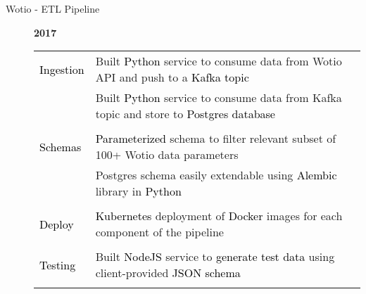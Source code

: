 \documentclass[12pt]{article}
\begin{document}
\begin{description}
\begin{description}
                \item[Wotio - ETL Pipeline] \hfill \textbf{2017}\\
		\textcolor{gray}{
			    \begin{tabular}{l|l}
					\\[-1.0mm]
				\textcolor{black}{Ingestion}& Built \textcolor{black}{Python} service to consume data from Wotio API and push to a \textcolor{black}{Kafka topic}\\
					  & Built \textcolor{black}{Python} service to consume data from Kafka topic and store to \textcolor{black}{Postgres database}\\
					\\[-1.7mm]
				\textcolor{black}{Schemas}   & \textcolor{black}{Parameterized} schema to filter relevant subset of 100+ Wotio data parameters\\
					  & Postgres schema easily extendable using \textcolor{black}{Alembic} library in \textcolor{black}{Python}\\
					\\[-1.7mm]
				\textcolor{black}{Deploy}   & \textcolor{black}{Kubernetes} deployment of \textcolor{black}{Docker} images for each component of the pipeline\\
					\\[-1.7mm]
				\textcolor{black}{Testing}  & Built \textcolor{black}{NodeJS} service to \textcolor{black}{generate test data} using client-provided \textcolor{black}{JSON schema}\\
					\\[-1.0mm]
			    \end{tabular}
		}


\end{description}
\end{description}
\end{document}

